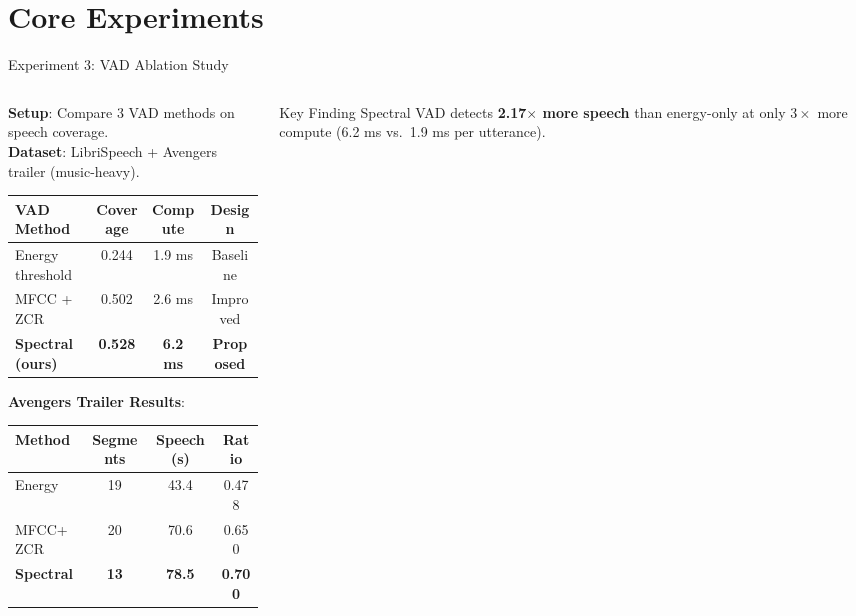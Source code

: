 \documentclass[aspectratio=169]{beamer}
\begin{document}
\section{Core Experiments}
\begin{frame}{Experiment 3: VAD Ablation Study}
  \begin{columns}[T]
    \begin{column}{0.55\textwidth}
      \textbf{Setup}: Compare 3 VAD methods on speech coverage.\\
      \textbf{Dataset}: LibriSpeech + Avengers trailer (music-heavy).

      \vspace{0.3cm}
      \begin{center}
        \begin{tabular}{@{}lccc@{}}
          \toprule
          \textbf{VAD Method} & \textbf{Coverage} & \textbf{Compute} & \textbf{Design} \\
          \midrule
          Energy threshold & 0.244 & 1.9 ms & Baseline \\
          MFCC + ZCR & 0.502 & 2.6 ms & Improved \\
          \rowcolor{lightgray}
          \textbf{Spectral (ours)} & \textbf{0.528} & \textbf{6.2 ms} & \textbf{Proposed} \\
          \bottomrule
        \end{tabular}
      \end{center}

      \vspace{0.3cm}
      \textbf{Avengers Trailer Results}:
      \begin{center}
        \small
        \begin{tabular}{@{}lccc@{}}
          \toprule
          Method & Segments & Speech (s) & Ratio \\
          \midrule
          Energy & 19 & 43.4 & 0.478 \\
          MFCC+ZCR & 20 & 70.6 & 0.650 \\
          \rowcolor{lightgray}
          \textbf{Spectral} & \textbf{13} & \textbf{78.5} & \textbf{0.700} \\
          \bottomrule
        \end{tabular}
      \end{center}
    \end{column}
    \begin{column}{0.42\textwidth}
      \begin{block}{Key Finding}
        Spectral VAD detects \textbf{2.17$\times$ more speech} than energy-only at only $3\times$ more compute (6.2 ms vs.\ 1.9 ms per utterance).
        \vspace{0.2cm}


\end{block}
\end{column}
\end{columns}
\end{frame}
\end{document}
